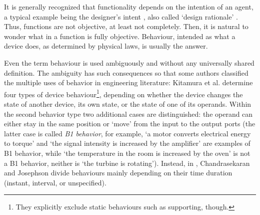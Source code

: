 \documentclass[sw]{iosart2x}
\newcommand{\firstTimeKeyWord}[1]{\textit{#1}}
\newcommand{\quotes}[1]{`#1'}
\newcommand{\TODO}[1]{{%
}}
\begin{document}
It is generally recognized that functionality depends on the intention of an agent, a typical example being the designer's intent  \cite{kitamuraOntologyBasedFunctionalKnowledgeModeling2004}, also called \quotes{design rationale} \cite{chandrasekaranFunctionalRepresentationDesign1993}. 
Thus, functions are not objective, at least not completely. 
Then, it is natural to wonder what in a function is fully objective. Behaviour, intended as what a device does, as determined by physical laws, is usually the answer.    


Even the term behaviour is used ambiguously and without any universally shared definition. 
The ambiguity has such consequences so that some authors classified the multiple uses of behavior in engineering literature: 
Kitamura et al. \cite{kitamuraOntologyBasedFunctionalKnowledgeModeling2004} determine four types of device behaviour\footnote{They explicitly exclude static behaviours such as supporting, though.}, depending on whether the device changes the state of another device, its own state, or the state of one of its operands. Within the second behavior type two additional cases are distinguished: the operand can either stay in the same position or `move' from the input to the output ports (the latter case is called \firstTimeKeyWord{B1 behavior}, for example, \quotes{a motor converts electrical energy to torque} and \quotes{the signal intensity is increased by the amplifier} are examples of B1 behavior, while \quotes{the temperature in the room is increased by the oven} is not a B1 behavior, neither is \quotes{the turbine is rotating}).
Instead, in \cite{chandrasekaranFunctionDeviceRepresentation2000}, Chandrasekaran and Josephson divide behaviours mainly depending on their time duration (instant, interval, or unspecified).

\end{document}

